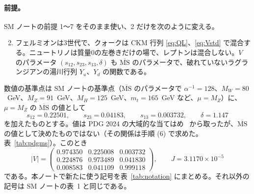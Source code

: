 \documentclass[a4paper,10pt]{ltjsarticle}
\newcommand{\MSbar}{\overline{\mathrm{MS}}}
\begin{document}
\paragraph{前提。}SM ノートの前提 1〜7 をそのまま使い、2 だけを次のように変える。
\begin{enumerate}
\setcounter{enumi}{1}
\item フェルミオンは3世代で、クォークは CKM 行列 \eqref{eq:QL}、\eqref{eq:Vstd} で混合する。ニュートリノは質量0の左巻きだけの場で、レプトンは混合しない。$V$ のパラメータ $(s_{12},s_{23},s_{13},\delta)$ も $\MSbar$ のパラメータで、破れていないラグランジアンの湯川行列 $Y_u$、$Y_d$ の関数である。
\end{enumerate}
数値の基準点は SM ノートの基準点（$\MSbar$ のパラメータで $\alpha^{-1}=128$、$M_W=80$~GeV、$M_Z=91$~GeV、$M_H=125$~GeV、$m_t=165$~GeV など、$\mu=M_Z$）に、$\mu=M_Z$ の $\MSbar$ の値として
\begin{equation}
s_{12}=0.22501,\qquad s_{23}=0.04183,\qquad s_{13}=0.003732,\qquad \delta=1.147
\label{eq:bench}
\end{equation}
を加えたものとする。値は PDG 2024 の大域的な当てはめ~\cite{pdg24} から取ったが、$\MSbar$ の値として決めたものではない（その関係は手順 (6) で求めた。表~\ref{tab:pdgms}）。このとき
\begin{equation*}
|V|=\begin{pmatrix}0.974350 & 0.225008 & 0.003732\\ 0.224876 & 0.973489 & 0.041830\\ 0.008583 & 0.041109 & 0.999118\end{pmatrix},\qquad J=3.1170\times10^{-5}
\end{equation*}
である。本ノートで新たに使う記号を表~\ref{tab:notation} にまとめる。それ以外の記号は SM ノートの表~1 と同じである。
\end{document}

